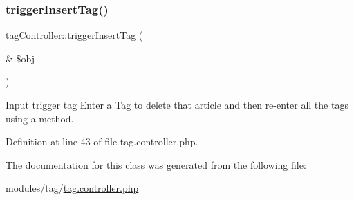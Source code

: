 \subsubsection{\texorpdfstring{trigger\+Insert\+Tag()}{triggerInsertTag()}}
{\footnotesize\ttfamily tag\+Controller\+::trigger\+Insert\+Tag (\begin{DoxyParamCaption}\item[{\&}]{\$obj }\end{DoxyParamCaption})}



Input trigger tag Enter a Tag to delete that article and then re-\/enter all the tags using a method. 



Definition at line 43 of file tag.\+controller.\+php.



The documentation for this class was generated from the following file\+:\begin{DoxyCompactItemize}
\item 
modules/tag/\hyperlink{tag_8controller_8php}{tag.\+controller.\+php}\end{DoxyCompactItemize}
